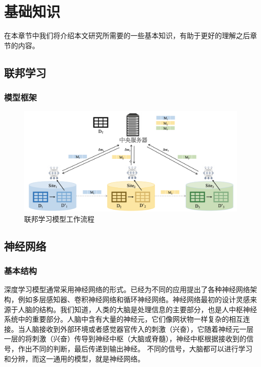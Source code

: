 \chapter{基础知识}
\label{ch2}
在本章节中我们将介绍本文研究所需要的一些基本知识，有助于更好的理解之后章节的内容。

\section{联邦学习}


\subsection{模型框架}

\begin{figure}[!hbt]
\centering
	\includegraphics[scale=0.45]{fig2/C2/联邦学习模型流程}%
	\caption{联邦学习模型工作流程}
	\label{fig:联邦学习模型工作流程}	
\end{figure}



\section{神经网络}
\subsection{基本结构}
深度学习模型通常采用神经网络的形式。已经为不同的应用提出了各种神经网络架构，例如多层感知器、卷积神经网络和循环神经网络。神经网络最初的设计灵感来源于人脑的结构。我们知道，人类的大脑是处理信息的主要部分，也是人中枢神经系统中的重要部分。人脑中含有大量的神经元，它们像网状物一样复杂的相互连接。当人脑接收到外部环境或者感觉器官传入的刺激（兴奋），它随着神经元一层一层的将刺激（兴奋）传导到神经中枢（大脑或脊髓），神经中枢根据接收到的信号，作出不同的判断，最后传递到输出神经。
不同的信号，大脑都可以进行学习和分辨，而这一通用的模型，就是神经网络。

